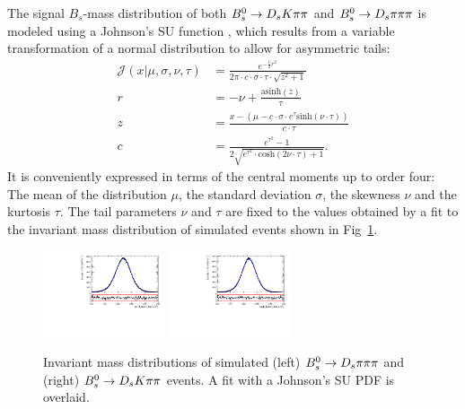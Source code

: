 The signal $B_s$-mass distribution of both ${{B}^0_{s}}\rightarrow{\ensuremath{{D}_{s}}}{\ensuremath{K}}{\ensuremath{\pi}}{\ensuremath{\pi}}$ and ${{B}^0_{s}}\rightarrow{\ensuremath{{D}_{s}}}{\ensuremath{\pi}}{\ensuremath{\pi}}{\ensuremath{\pi}}$  is modeled using a Johnson's SU function \cite{10.2307/2332539}, which 
results from a variable transformation of a normal distribution to allow for asymmetric tails:
\begin{align}
\mathcal J(x\vert\mu,\sigma,\nu,\tau) &=
\frac{e^{- \frac{1}{2} r^2}}{2\pi \cdot c \cdot \sigma \cdot \tau \cdot \sqrt{z^2+1}} \\
r &= - \nu + \frac{\text{asinh}(z)}{\tau} \\
z & = \frac{x-(\mu - c \cdot \sigma \cdot e^\tau \text{sinh}(\nu\cdot \tau))}{c \cdot \tau} \\
c &= \frac{e^{\tau^2}-1}{2\sqrt{e^{\tau^2} \cdot \text{cosh}(2 \nu \cdot \tau)+1}} .
\label{eq:RooJohnsonSU}
\end{align}
It is conveniently expressed in terms of the central moments up to order four: 
The mean of the distribution $\mu$, the standard deviation $\sigma$,
the skewness $\nu$ and the kurtosis $\tau$.
The tail parameters $\nu$ and $\tau$ are fixed to the values obtained by a fit to the invariant mass distribution of simulated events shown in Fig~\ref{fig: BsMassShapes}. 
\begin{figure}[b]
\centering
\includegraphics[height=!,width=0.32\textwidth]{figs/MassFit/normMC_pull.pdf} 
\includegraphics[height=!,width=0.32\textwidth]{figs/MassFit/signalMC_pull.pdf}
\caption{Invariant mass distributions of simulated (left) ${{B}^0_{s}}\rightarrow{\ensuremath{{D}_{s}}}{\ensuremath{\pi}}{\ensuremath{\pi}}{\ensuremath{\pi}}$ and (right) ${{B}^0_{s}}\rightarrow{\ensuremath{{D}_{s}}}{\ensuremath{K}}{\ensuremath{\pi}}{\ensuremath{\pi}}$ events. A fit with a Johnson's SU PDF is overlaid.}
\label{fig: BsMassShapes}
\end{figure}
